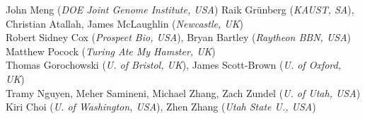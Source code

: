 \documentclass[draftspec]{sbmlpkgspec}
\begin{document}
{John Meng (\emph{DOE Joint Genome Institute, USA})
Raik Gr\"unberg (\emph{KAUST, SA}),\\
Christian Atallah, James McLaughlin (\emph{Newcastle, UK})\\ 
Robert Sidney Cox (\emph{Prospect Bio, USA}), Bryan Bartley (\emph{Raytheon BBN, USA}) \\
Matthew Pocock (\emph{Turing Ate My Hamster, UK}) \\
Thomas Gorochowski (\emph{U. of Bristol, UK}), James Scott-Brown (\emph{U. of Oxford, UK})\\
Tramy Nguyen, Meher Samineni, Michael Zhang, Zach Zundel (\emph{U. of Utah, USA})\\
Kiri Choi (\emph{U. of Washington, USA}), Zhen Zhang (\emph{Utah State U., USA})\\
}


\maketitlepage
\maketableofcontents

























\newpage


\appendix




\end{document}
